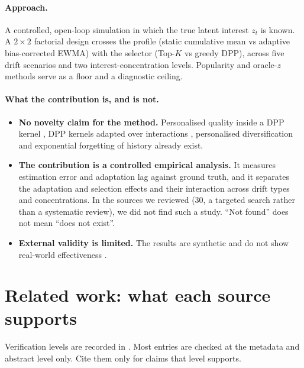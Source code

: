 \documentclass[11pt,a4paper]{article}
\begin{document}
\paragraph{Approach.} A controlled, open-loop simulation in which the true latent interest
$z_t$ is known. A $2\times 2$ factorial design crosses the profile (static cumulative mean vs
adaptive bias-corrected EWMA) with the selector (Top-$K$ vs greedy DPP), across five drift
scenarios and two interest-concentration levels. Popularity and oracle-$z$ methods serve as a
floor and a diagnostic ceiling.

\paragraph{What the contribution is, and is not.}
\begin{itemize}
  \item \textbf{No novelty claim for the method.} Personalised quality inside a DPP kernel
        \citep{ibrahim2025personalized}, DPP kernels adapted over interactions
        \citep{liu2019d2rl}, personalised diversification \citep{teo2016adaptive} and
        exponential forgetting of history \citep{ding2005time,koren2009temporal} already exist.
  \item \textbf{The contribution is a controlled empirical analysis.} It measures estimation
        error and adaptation lag against ground truth, and it separates the adaptation and
        selection effects and their interaction across drift types and concentrations. In the
        sources we reviewed (30, a targeted search rather than a systematic review), we did not
        find such a study. ``Not found'' does not mean ``does not exist''.
  \item \textbf{External validity is limited.} The results are synthetic and do not show
        real-world effectiveness \citep{stavinova2022synthetic}.
\end{itemize}

\section{Related work: what each source supports}
Verification levels are recorded in . Most entries are
checked at the metadata and abstract level only. Cite them only for claims that level
supports.
\end{document}
